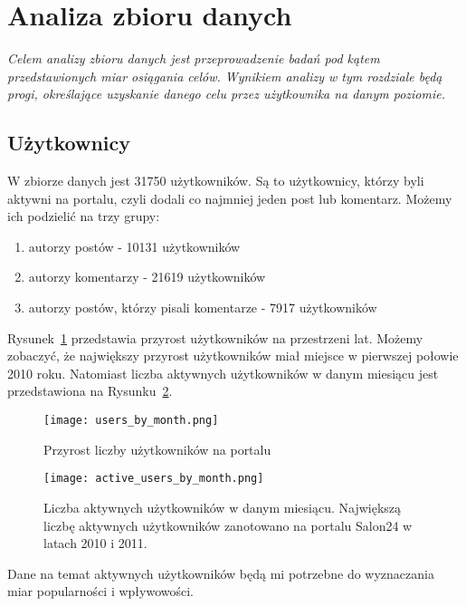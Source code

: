 \documentclass[polish,12pt]{aghthesis}
\begin{document}
\newpage
\section{Analiza zbioru danych}
\emph{Celem analizy zbioru danych jest przeprowadzenie badań pod kątem przedstawionych miar osiągania celów. Wynikiem analizy w tym rozdziale będą progi, określające uzyskanie danego celu przez użytkownika na danym poziomie.}




\subsection{Użytkownicy}

W zbiorze danych jest 31750 użytkowników. Są to użytkownicy, którzy byli aktywni na portalu, czyli dodali co najmniej jeden post lub komentarz. Możemy ich podzielić na trzy grupy: 

\begin{enumerate}
    \item autorzy postów - 10131 użytkowników
    \item autorzy komentarzy - 21619 użytkowników
    \item autorzy postów, którzy pisali komentarze - 7917 użytkowników
\end{enumerate}{}

Rysunek~\ref{fig:users_by_month} przedstawia przyrost użytkowników na przestrzeni lat. 
Możemy zobaczyć, że największy przyrost użytkowników miał miejsce w pierwszej połowie 2010 roku. Natomiast liczba aktywnych użytkowników w danym miesiącu jest przedstawiona na Rysunku~\ref{fig:active_users_by_month}. 

\begin{figure}[ht]
    \centering
    \texttt{[image: users\_by\_month.png]}
    \caption{Przyrost liczby użytkowników na portalu}
    \label{fig:users_by_month}
\end{figure}

\begin{figure}[ht]
    \centering
    \texttt{[image: active\_users\_by\_month.png]}
    \caption[Liczba aktywnych użytkowników w miesiącu]{Liczba aktywnych użytkowników w danym miesiącu. Największą liczbę aktywnych użytkowników zanotowano na portalu Salon24 w latach 2010 i 2011.}
    \label{fig:active_users_by_month}
\end{figure}



Dane na temat aktywnych użytkowników będą mi potrzebne do wyznaczania miar popularności i wpływowości.
\end{document}
